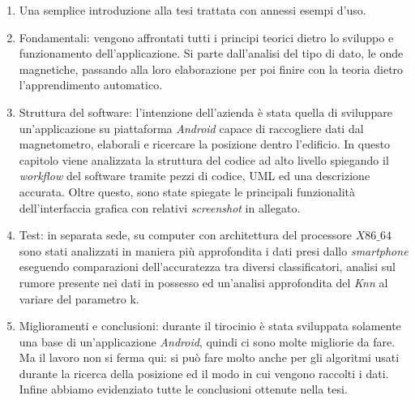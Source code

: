 \documentclass[10pt,a4paper]{article}
\begin{document}
	\begin{enumerate}
		\item Una semplice introduzione alla tesi trattata con annessi esempi d'uso.
		\item Fondamentali: vengono affrontati tutti i principi teorici dietro lo sviluppo e funzionamento dell'applicazione. Si parte dall'analisi del tipo di dato, le onde magnetiche, passando alla loro elaborazione per poi finire con la teoria dietro l'apprendimento automatico.
		\item Struttura del software: l'intenzione dell'azienda \`e stata quella di sviluppare un'applicazione su piattaforma \textit{Android} capace di raccogliere dati dal magnetometro, elaborali e ricercare la posizione dentro l'edificio. In questo capitolo viene analizzata la struttura del codice ad alto livello spiegando il \textit{workflow} del software tramite pezzi di codice, UML ed una descrizione accurata. Oltre questo, sono state spiegate le principali funzionalit\`a dell'interfaccia grafica con relativi \textit{screenshot} in allegato.
		\item Test: in separata sede, su computer con architettura del processore $X86\_64$ sono stati analizzati in maniera pi\`u approfondita i dati  presi dallo \textit{smartphone} eseguendo comparazioni dell'accuratezza tra diversi classificatori, analisi sul rumore presente nei dati in possesso ed un'analisi approfondita del \textit{Knn} al variare del parametro k.
		\item Miglioramenti e conclusioni: durante il tirocinio \`e stata sviluppata solamente una base di un'applicazione \textit{Android}, quindi ci sono molte migliorie da fare. Ma il lavoro non si ferma qui: si pu\`o fare molto anche per gli algoritmi usati durante la ricerca della posizione ed il modo in cui vengono raccolti i dati. Infine abbiamo evidenziato tutte le conclusioni ottenute nella tesi.
	\end{enumerate}
\end{document}
